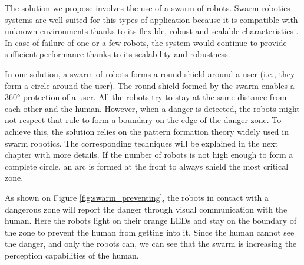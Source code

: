 \documentclass[oneside, a4paper, 12pt]{memoir}
\begin{document}
	The solution we propose involves the use of a swarm of robots. Swarm robotics systems are well suited for this types of application because it is compatible with unknown environments thanks to its flexible, robust and scalable characteristics \citep{brambilla2013swarm}. In case of failure of one or a few robots, the system would continue to provide sufficient performance thanks to its scalability and robustness.
	
	In our solution, a swarm of robots forms a round shield around a user (i.e., they form a circle around the user). The round shield formed by the swarm enables a 360° protection of a user. All the robots try to stay at the same distance from each other and the human. However, when a danger is detected, the robots might not respect that rule to form a boundary on the edge of the danger zone. To achieve this, the solution relies on the pattern formation theory widely used in swarm robotics. The corresponding techniques will be explained in the next chapter with more details. If the number of robots is not high enough to form a complete circle, an arc is formed at the front to always shield the most critical zone.
	
	As shown on Figure \ref{fig:swarm_preventing}, the robots in contact with a dangerous zone will report the danger through visual communication with the human. Here the robots light on their orange LEDs and stay on the boundary of the zone to prevent the human from getting into it. Since the human cannot see the danger, and only the robots can, we can see that the swarm is increasing the perception capabilities of the human.
		
\end{document}
